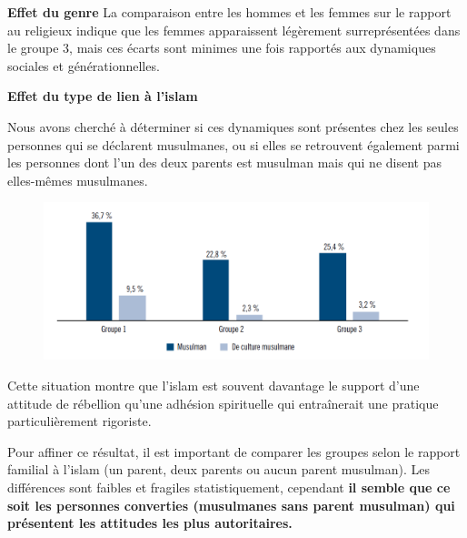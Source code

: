 \textbf{Effet du genre}
La comparaison entre les hommes et les femmes sur le rapport au
religieux indique que les femmes apparaissent légèrement surreprésentées
dans le groupe 3, mais ces écarts sont minimes une fois rapportés aux
dynamiques sociales et générationnelles. 

\textbf{Effet du type de lien à l'islam}

Nous avons cherché à déterminer si ces dynamiques sont présentes chez
les seules personnes qui se déclarent musulmanes, ou si elles se
retrouvent également parmi les personnes dont l'un des deux parents est
musulman mais qui ne disent pas elles-mêmes musulmanes.



\begin{figure}
    \centering
  
  \includegraphics[width=\textwidth]{ImageIslamFrance/lienIslam.png}
  
\end{figure}



\begin{Synthesis}
Cette situation montre que l'islam est souvent davantage le support
d'une attitude de rébellion qu'une adhésion spirituelle qui entraînerait
une pratique particulièrement rigoriste.
\end{Synthesis}


Pour affiner ce résultat, il est important de comparer les groupes selon
le rapport familial à l'islam (un parent, deux parents ou aucun parent
musulman). Les différences sont faibles et fragiles statistiquement,
cependant \textbf{il semble que ce soit les personnes converties
(musulmanes sans parent musulman) qui présentent les attitudes les plus
autoritaires.}

